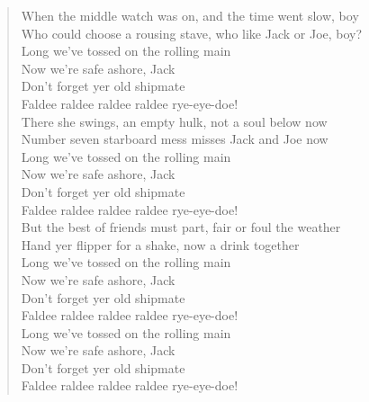 \documentclass[11pt]{article}
\begin{document}
\begin{verse}
\vspace*{1em}
When the middle watch was on, and the time went slow, boy\\
Who could choose a rousing stave, who like Jack or Joe, boy?\\
\vspace*{1em}
Long we've tossed on the rolling main\\
Now we're safe ashore, Jack\\
Don't forget yer old shipmate\\
Faldee raldee raldee raldee rye-eye-doe!\\
There she swings, an empty hulk, not a soul below now\\
Number seven starboard mess misses Jack and Joe now\\
\vspace*{1em}
Long we've tossed on the rolling main\\
Now we're safe ashore, Jack\\
Don't forget yer old shipmate\\
Faldee raldee raldee raldee rye-eye-doe!\\
\vspace*{1em}
But the best of friends must part, fair or foul the weather\\
Hand yer flipper for a shake, now a drink together\\
\vspace*{1em}
Long we've tossed on the rolling main\\
Now we're safe ashore, Jack\\
Don't forget yer old shipmate\\
Faldee raldee raldee raldee rye-eye-doe!\\
\vspace*{1em}
Long we've tossed on the rolling main\\
Now we're safe ashore, Jack\\
Don't forget yer old shipmate\\
Faldee raldee raldee raldee rye-eye-doe!\\
\end{verse}
\clearpage
\end{document}
